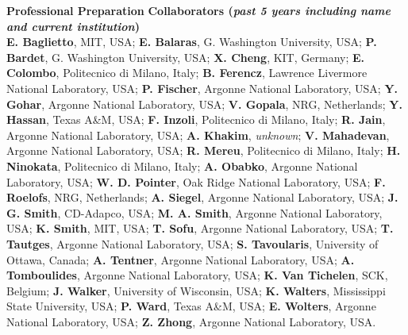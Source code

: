 \documentclass[11pt,letterpaper,english]{article}
\begin{document}
\begin{flushleft} {\bf Professional Preparation}
\vspace{-6pt}
{\bf Collaborators ({\emph{past 5 years including name and current institution}})}
{\parindent 16pt
~\\
\textbf{E. Baglietto}, MIT, USA;  \textbf{E. Balaras}, G. Washington University, USA;  \textbf{P. Bardet}, G. Washington University, USA;  \textbf{X. Cheng}, KIT, Germany;  \textbf{E. Colombo}, Politecnico di Milano, Italy;  \textbf{B. Ferencz}, Lawrence Livermore National Laboratory, USA;  \textbf{P. Fischer}, Argonne National Laboratory, USA;  \textbf{Y. Gohar}, Argonne National Laboratory, USA;  \textbf{V. Gopala}, NRG, Netherlands;  \textbf{Y. Hassan}, Texas A\&M, USA;  \textbf{F. Inzoli},  Politecnico di Milano, Italy; \textbf{R. Jain}, Argonne National Laboratory, USA;  \textbf{A. Khakim}, \textit{unknown};  \textbf{V. Mahadevan}, Argonne National Laboratory, USA;  \textbf{R. Mereu}, Politecnico di Milano, Italy;  \textbf{H. Ninokata}, Politecnico di Milano, Italy;  \textbf{A. Obabko}, Argonne National Laboratory, USA;  \textbf{W. D. Pointer}, Oak Ridge National Laboratory, USA;  \textbf{F. Roelofs}, NRG, Netherlands;  \textbf{A. Siegel}, Argonne National Laboratory, USA; \textbf{J. G. Smith}, CD-Adapco, USA; \textbf{M. A. Smith}, Argonne National Laboratory, USA;  \textbf{K. Smith}, MIT, USA; \textbf{T. Sofu}, Argonne National Laboratory, USA; \textbf{T. Tautges}, Argonne National Laboratory, USA;  \textbf{S. Tavoularis}, University of Ottawa, Canada;  \textbf{A. Tentner}, Argonne National Laboratory, USA;  \textbf{A. Tomboulides}, Argonne National Laboratory, USA; \textbf{K. Van Tichelen}, SCK, Belgium; \textbf{J. Walker}, University of Wisconsin, USA;  \textbf{K. Walters}, Mississippi State University, USA;  \textbf{P. Ward}, Texas A\&M, USA; \textbf{E. Wolters}, Argonne National Laboratory, USA;  \textbf{Z. Zhong}, Argonne National Laboratory, USA.
}

\end{flushleft}
\end{document}
